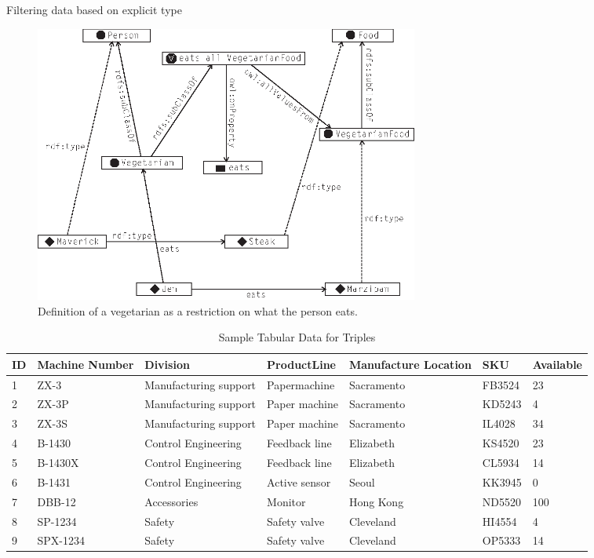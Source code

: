 \begin{challenge}{Filtering data based on explicit type}
\begin{figure}
\centering
\includegraphics[width=5in]{media/ch12/f12-09.eps}
\caption{Definition of a vegetarian as a restriction on what the person eats.}
\label{fig:ch12.09}
\end{figure}


\begin{table}[h]
\centering
\begin{tabular}{||l l l l l l l ||} 
 \hline
 ID&Machine Number&Division&ProductLine&Manufacture Location&SKU&Available \\ 
 \hline\hline
1&ZX-3&Manufacturing support&Papermachine&Sacramento&FB3524&23\\
2&ZX-3P&Manufacturing support&Paper machine&Sacramento&KD5243&4\\
3&ZX-3S&Manufacturing support&Paper machine&Sacramento&IL4028&34\\
4&B-1430&Control Engineering&Feedback line&Elizabeth&KS4520&23\\
5&B-1430X&Control Engineering&Feedback line&Elizabeth&CL5934&14\\
6&B-1431&Control Engineering&Active sensor&Seoul&KK3945&0\\
7&DBB-12&Accessories&Monitor&Hong Kong&ND5520&100\\
8&SP-1234&Safety&Safety valve&Cleveland&HI4554&4\\
9&SPX-1234&Safety&Safety valve&Cleveland&OP5333&14\\
\hline
\end{tabular}
\caption{Sample Tabular Data for Triples}
\label{tab:ch12.1}
\end{table}



\end{challenge}
